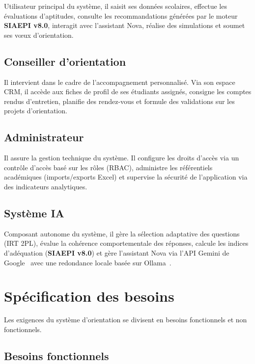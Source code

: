 Utilisateur principal du système, il saisit ses données scolaires, effectue les évaluations d'aptitudes, consulte les recommandations générées par le moteur \textbf{SIAEPI v8.0}, interagit avec l'assistant Nova, réalise des simulations et soumet ses vœux d'orientation.

\subsection{Conseiller d'orientation}

Il intervient dans le cadre de l'accompagnement personnalisé. Via son espace CRM, il accède aux fiches de profil de ses étudiants assignés, consigne les comptes rendus d'entretien, planifie des rendez-vous et formule des validations sur les projets d'orientation.

\subsection{Administrateur}

Il assure la gestion technique du système. Il configure les droits d'accès via un contrôle d'accès basé sur les rôles (RBAC), administre les référentiels académiques (imports/exports Excel) et supervise la sécurité de l'application via des indicateurs analytiques.

\subsection{Système IA}

Composant autonome du système, il gère la sélection adaptative des questions (IRT 2PL), évalue la cohérence comportementale des réponses, calcule les indices d'adéquation (\textbf{SIAEPI v8.0}) et gère l'assistant Nova via l'API Gemini de Google~\cite{gemini} avec une redondance locale basée sur Ollama~\cite{ollama}.

\section{Spécification des besoins}
\label{sec:besoins}

Les exigences du système d'orientation se divisent en besoins fonctionnels et non fonctionnels.

\subsection{Besoins fonctionnels}

